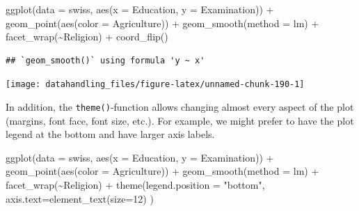 \documentclass[
  12pt,
]{style/krantz}
\newenvironment{Shaded}{\begin{snugshade}}{\end{snugshade}}
\newcommand{\AttributeTok}[1]{\textcolor[rgb]{0.77,0.63,0.00}{#1}}
\newcommand{\DecValTok}[1]{\textcolor[rgb]{0.00,0.00,0.81}{#1}}
\newcommand{\FunctionTok}[1]{\textcolor[rgb]{0.00,0.00,0.00}{#1}}
\newcommand{\NormalTok}[1]{#1}
\newcommand{\SpecialCharTok}[1]{\textcolor[rgb]{0.00,0.00,0.00}{#1}}
\newcommand{\StringTok}[1]{\textcolor[rgb]{0.31,0.60,0.02}{#1}}
\begin{document}
\begin{Shaded}
\begin{Highlighting}[]
\FunctionTok{ggplot}\NormalTok{(}\AttributeTok{data =}\NormalTok{ swiss, }\FunctionTok{aes}\NormalTok{(}\AttributeTok{x =}\NormalTok{ Education, }\AttributeTok{y =}\NormalTok{ Examination)) }\SpecialCharTok{+}
     \FunctionTok{geom\_point}\NormalTok{(}\FunctionTok{aes}\NormalTok{(}\AttributeTok{color =}\NormalTok{ Agriculture)) }\SpecialCharTok{+}
     \FunctionTok{geom\_smooth}\NormalTok{(}\AttributeTok{method =} \StringTok{\textquotesingle{}lm\textquotesingle{}}\NormalTok{) }\SpecialCharTok{+}
     \FunctionTok{facet\_wrap}\NormalTok{(}\SpecialCharTok{\textasciitilde{}}\NormalTok{Religion) }\SpecialCharTok{+}
     \FunctionTok{coord\_flip}\NormalTok{()}
\end{Highlighting}
\end{Shaded}

\begin{verbatim}
## `geom_smooth()` using formula 'y ~ x'
\end{verbatim}

\texttt{[image: datahandling\_files/figure-latex/unnamed-chunk-190-1]}

In addition, the \texttt{theme()}-function allows changing almost every aspect of the plot (margins, font face, font size, etc.). For example, we might prefer to have the plot legend at the bottom and have larger axis labels.

\begin{Shaded}
\begin{Highlighting}[]
\FunctionTok{ggplot}\NormalTok{(}\AttributeTok{data =}\NormalTok{ swiss, }\FunctionTok{aes}\NormalTok{(}\AttributeTok{x =}\NormalTok{ Education, }\AttributeTok{y =}\NormalTok{ Examination)) }\SpecialCharTok{+}
     \FunctionTok{geom\_point}\NormalTok{(}\FunctionTok{aes}\NormalTok{(}\AttributeTok{color =}\NormalTok{ Agriculture)) }\SpecialCharTok{+}
     \FunctionTok{geom\_smooth}\NormalTok{(}\AttributeTok{method =} \StringTok{\textquotesingle{}lm\textquotesingle{}}\NormalTok{) }\SpecialCharTok{+}
     \FunctionTok{facet\_wrap}\NormalTok{(}\SpecialCharTok{\textasciitilde{}}\NormalTok{Religion) }\SpecialCharTok{+}
     \FunctionTok{theme}\NormalTok{(}\AttributeTok{legend.position =} \StringTok{"bottom"}\NormalTok{, }\AttributeTok{axis.text=}\FunctionTok{element\_text}\NormalTok{(}\AttributeTok{size=}\DecValTok{12}\NormalTok{) )}
\end{Highlighting}
\end{Shaded}
\end{document}
